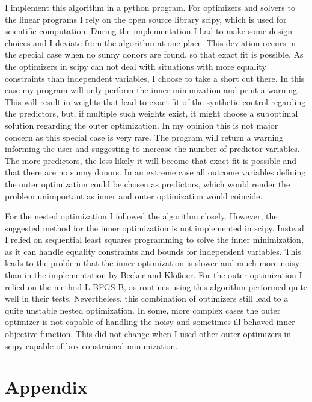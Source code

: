 \documentclass[10pt, a4paper]{article}
\begin{document}
I implement this algorithm in a python program. For optimizers and solvers to the linear programs I rely on the open source library scipy, which is used for scientific computation. During the implementation I had to make some design choices and I deviate from the algorithm at one place. This deviation occurs in the special case when no sunny donors are found, so that exact fit is possible. As the optimizers in scipy can not deal with situations with more equality constraints than independent variables, I choose to take a short cut there. In this case my program will only perform the inner minimization and print a warning. This will result in weights that lead to exact fit of the synthetic control regarding the predictors, but, if multiple such weights exist, it might choose a suboptimal solution regarding the outer optimization. In my opinion this is not major concern as this special case is very rare. The program will return a warning informing the user and suggesting to increase the number of predictor variables. The more predictors, the less likely it will become that exact fit is possible and that there are no sunny donors. In an extreme case all outcome variables defining the outer optimization could be chosen as predictors, which would render the problem unimportant as inner and outer optimization would coincide.

For the nested optimization I followed the algorithm closely. However, the suggested method for the inner optimization is not implemented in scipy. Instead I relied on sequential least squares programming to solve the inner minimization, as it can handle equality constraints and bounds for independent variables. This leads to the problem that the inner optimization is slower and much more noisy than in the implementation by Becker and Klößner. For the outer optimization I relied on the method L-BFGS-B, as routines using this algorithm performed quite well in their tests. Nevertheless, this combination of optimizers still lead to a quite unstable nested optimization. In some, more complex cases the outer optimizer is not capable of handling the noisy and sometimes ill behaved inner objective function. This did not change when I used other outer optimizers in scipy capable of box constrained minimization.  





\clearpage


\section{Appendix} %
\label{sec:appendix} 
\end{document}
